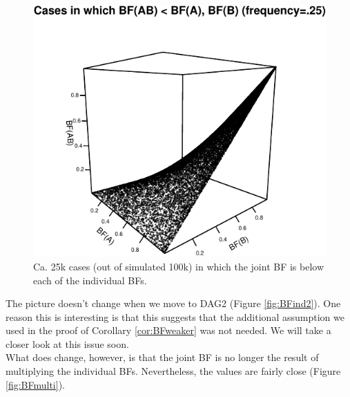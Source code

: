 \documentclass[
  10pt,
  dvipsnames,enabledeprecatedfontcommands]{scrartcl}
\begin{document}
\begin{figure}

\begin{center}\includegraphics[width=1\linewidth]{conjunction-appendix12_files/figure-latex/unnamed-chunk-11-1} \end{center}
\caption{Ca. 25k cases (out of simulated 100k) in which the joint BF is below each of the individual BFs.}
\label{fig:BFfails}
\end{figure}

The picture doesn't change when we move to \textsf{DAG2} (Figure
\ref{fig:BFind2}). One reason this is interesting is that this suggests
that the additional assumption we used in the proof of Corollary
\ref{cor:BFweaker} was not needed. We will take a closer look at this
issue soon.\\
What does change, however, is that the joint BF is no longer the result
of multiplying the individual BFs. Nevertheless, the values are fairly
close (Figure \ref{fig:BFmulti}).

\vspace{1mm}
\footnotesize

\normalsize
\end{document}
